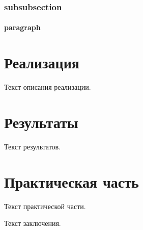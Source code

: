 \documentclass[a4paper, 14pt]{extreport}
\begin{document}
\subsubsection{subsubsection}

\paragraph{paragraph}

\section{Реализация}

Текст описания реализации.

\section{Результаты}

Текст результатов.




\section{Практическая часть}

Текст практической части.





\vkrConclution

Текст заключения.




\vkrEnd
\end{document}
